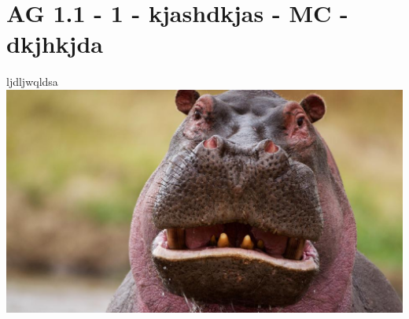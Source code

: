 \section{AG 1.1 - 1 - kjashdkjas - MC - dkjhkjda}

\begin{beispiel}[AG 1.1]{1}
ljdljwqldsa \includegraphics{../Beispieleinreichung/Bilder/AG11_1_hippo.eps}
\end{beispiel}